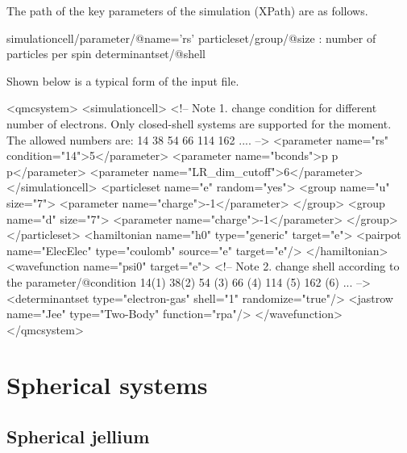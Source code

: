 The path of the key parameters of the simulation (XPath) are as follows.
\begin{lstcpp}
simulationcell/parameter/@name='rs'
particleset/group/@size : number of particles per spin
determinantset/@shell
\end{lstcpp}

Shown below is a typical form of the input file.
\begin{lstcpp}
<qmcsystem>
  <simulationcell>
    <!-- Note 1.
    change condition for different number of electrons. Only closed-shell
    systems are supported for the moment. The allowed numbers are:
    14 38 54 66 114 162 ....
    -->
    <parameter name="rs" condition="14">5</parameter>
    <parameter name="bconds">p p p</parameter>
    <parameter name="LR_dim_cutoff">6</parameter>
  </simulationcell>
  <particleset name="e" random="yes">
    <group name="u" size="7">
      <parameter name="charge">-1</parameter>
    </group>
    <group name="d" size="7">
      <parameter name="charge">-1</parameter>
    </group>
  </particleset>
  <hamiltonian name="h0" type="generic" target="e">
    <pairpot name="ElecElec" type="coulomb" source="e" target="e"/>
  </hamiltonian>
  <wavefunction name="psi0" target="e">
    <!-- Note 2.
    change shell according to the parameter/@condition
    14(1) 38(2) 54 (3) 66 (4) 114 (5) 162 (6) ...
    -->
    <determinantset type="electron-gas" shell="1" randomize="true"/>
    <jastrow name="Jee" type="Two-Body" function="rpa"/>
  </wavefunction>
</qmcsystem>
\end{lstcpp}
\section{Spherical systems}
\subsection{Spherical jellium}
%
